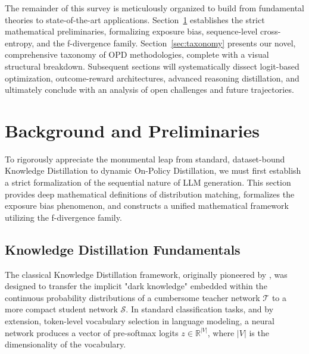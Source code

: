 \documentclass{article} %
\begin{document}
The remainder of this survey is meticulously organized to build from fundamental theories to state-of-the-art applications. Section~\ref{sec:background} establishes the strict mathematical preliminaries, formalizing exposure bias, sequence-level cross-entropy, and the f-divergence family. Section~\ref{sec:taxonomy} presents our novel, comprehensive taxonomy of OPD methodologies, complete with a visual structural breakdown. Subsequent sections will systematically dissect logit-based optimization, outcome-reward architectures, advanced reasoning distillation, and ultimately conclude with an analysis of open challenges and future trajectories.


\section{Background and Preliminaries}
\label{sec:background}

To rigorously appreciate the monumental leap from standard, dataset-bound Knowledge Distillation to dynamic On-Policy Distillation, we must first establish a strict formalization of the sequential nature of LLM generation. This section provides deep mathematical definitions of distribution matching, formalizes the exposure bias phenomenon, and constructs a unified mathematical framework utilizing the f-divergence family.

\subsection{Knowledge Distillation Fundamentals}
\label{subsec:kd_fundamentals}

The classical Knowledge Distillation framework, originally pioneered by \citet{hinton2015distilling}, was designed to transfer the implicit "dark knowledge" embedded within the continuous probability distributions of a cumbersome teacher network $\mathcal{T}$ to a more compact student network $\mathcal{S}$. In standard classification tasks, and by extension, token-level vocabulary selection in language modeling, a neural network produces a vector of pre-softmax logits $z \in \mathbb{R}^{|V|}$, where $|V|$ is the dimensionality of the vocabulary. 
\end{document}
